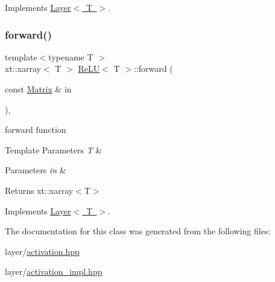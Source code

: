 Implements \mbox{\hyperlink{class_layer_ac4c13a3a85bfdd4d7d4d18669e3299fe}{Layer$<$ T $>$}}.

\mbox{\label{class_re_l_u_aef903f5e7d309e76f49abc34043354ce}} 
\subsubsection{\texorpdfstring{forward()}{forward()}}
{\footnotesize\ttfamily template$<$typename T $>$ \\
xt\+::xarray$<$ T $>$ \mbox{\hyperlink{class_re_l_u}{Re\+LU}}$<$ T $>$\+::forward (\begin{DoxyParamCaption}\item[{const \mbox{\hyperlink{class_re_l_u_a3d1448f06335a4ab7227ec31a43a410f}{Matrix}} \&}]{in }\end{DoxyParamCaption})\hspace{0.3cm}{\ttfamily [override]}, {\ttfamily [virtual]}}



forward function 


\begin{DoxyTemplParams}{Template Parameters}
{\em T} & \\
\hline
\end{DoxyTemplParams}

\begin{DoxyParams}{Parameters}
{\em in} & \\
\hline
\end{DoxyParams}
\begin{DoxyReturn}{Returns}
xt\+::xarray$<$\+T$>$ 
\end{DoxyReturn}


Implements \mbox{\hyperlink{class_layer_ab15b665c86974b1cf1d7ba4e309cb0e5}{Layer$<$ T $>$}}.



The documentation for this class was generated from the following files\+:\begin{DoxyCompactItemize}
\item 
layer/\mbox{\hyperlink{activation_8hpp}{activation.\+hpp}}\item 
layer/\mbox{\hyperlink{activation__impl_8hpp}{activation\+\_\+impl.\+hpp}}\end{DoxyCompactItemize}

